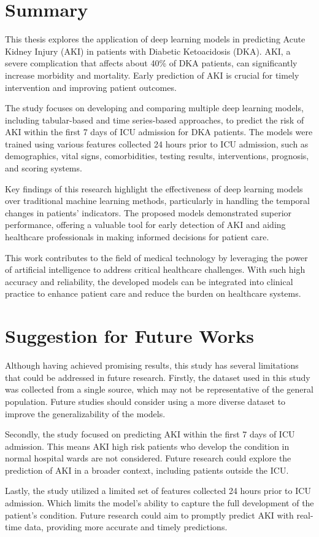 \documentclass[../main.tex]{subfiles}
\begin{document}
\section{Summary}


This thesis explores the application of deep learning models in predicting Acute Kidney Injury (AKI) in patients with Diabetic Ketoacidosis (DKA).
AKI, a severe complication that affects about 40\% of DKA patients, can significantly increase morbidity and mortality. 
Early prediction of AKI is crucial for timely intervention and improving patient outcomes.

The study focuses on developing and comparing multiple deep learning models, including tabular-based and time series-based approaches, to predict the risk of AKI within the first 7 days of ICU admission for DKA patients. 
The models were trained using various features collected 24 hours prior to ICU admission, such as demographics, vital signs, comorbidities, testing results, interventions, prognosis, and scoring systems.

Key findings of this research highlight the effectiveness of deep learning models over traditional machine learning methods, particularly in handling the temporal changes in patients' indicators. 
The proposed models demonstrated superior performance, offering a valuable tool for early detection of AKI and aiding healthcare professionals in making informed decisions for patient care.

This work contributes to the field of medical technology by leveraging the power of artificial intelligence to address critical healthcare challenges.
With such high accuracy and reliability, the developed models can be integrated into clinical practice to enhance patient care and reduce the burden on healthcare systems.


\section{Suggestion for Future Works }

Although having achieved promising results, this study has several limitations that could be addressed in future research.
Firstly, the dataset used in this study was collected from a single source, which may not be representative of the general population.
Future studies should consider using a more diverse dataset to improve the generalizability of the models.

Secondly, the study focused on predicting AKI within the first 7 days of ICU admission.
This means AKI high risk patients who develop the condition in normal hospital wards are not considered.
Future research could explore the prediction of AKI in a broader context, including patients outside the ICU.

Lastly, the study utilized a limited set of features collected 24 hours prior to ICU admission.
Which limits the model's ability to capture the full development of the patient's condition.
Future research could aim to promptly predict AKI with real-time data, providing more accurate and timely predictions.
\end{document}
